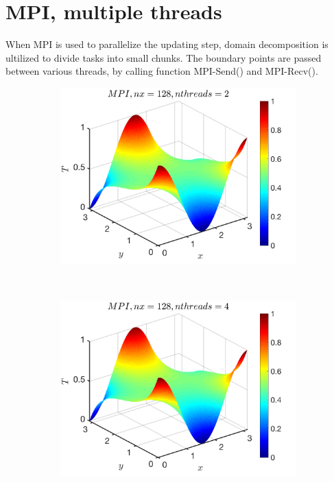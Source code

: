 \documentclass[a4paper]{article}
\begin{document}
    \section{MPI, multiple threads}
    When MPI is used to parallelize the updating step, domain decomposition is ultilized to divide tasks into small chunks. The boundary points are passed between various threads, by calling function MPI-Send() and MPI-Recv().
              \begin{figure}[H]
        \centering
        \begin{subfigure}[b]{0.32\textwidth}   
            \centering 
            \includegraphics[width=\textwidth]{./Figure/heat_mpi_nx128_nth2.png} 
        \end{subfigure}
        \
        \begin{subfigure}[b]{0.32\textwidth}   
            \centering 
            \includegraphics[width=\textwidth]{./Figure/heat_mpi_nx128_nth4.png}  

\end{subfigure}
\end{figure}
\end{document}
